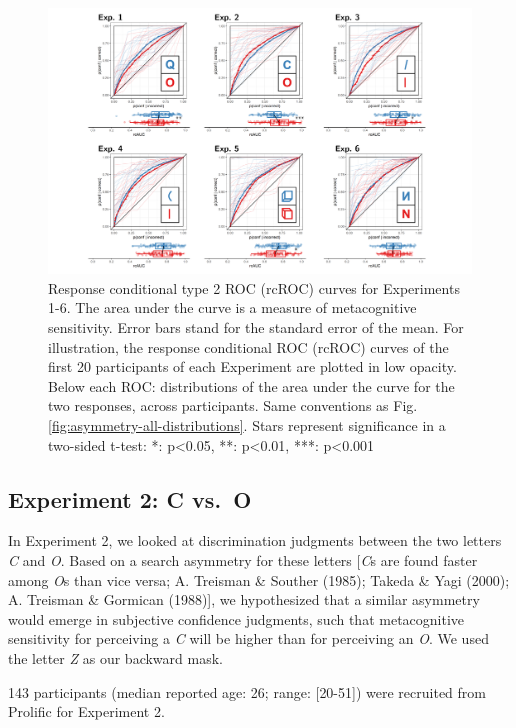 \documentclass[12pt,twoside]{reedthesis}
\begin{document}
\begin{figure}
\includegraphics[width=1\linewidth]{figure/asymmetry/rcROCs} \caption[rcROC curves for Experiments 1-6]{Response conditional type 2 ROC (rcROC) curves for Experiments 1-6. The area under the curve is a measure of metacognitive sensitivity. Error bars stand for the standard error of the mean. For illustration, the response conditional ROC (rcROC) curves of the first 20 participants of each Experiment are plotted in low opacity. Below each ROC: distributions of the area under the curve for the two responses, across participants. Same conventions as Fig. \ref{fig:asymmetry-all-distributions}. Stars represent significance in a two-sided t-test: *: p\textless0.05, **: p\textless0.01, ***: p\textless0.001}\label{fig:asymmetry-all-rcROCs}
\end{figure}
\hypertarget{experiment-2-c-vs.-o}{%
\subsection{Experiment 2: C vs.~O}\label{experiment-2-c-vs.-o}}

In Experiment 2, we looked at discrimination judgments between the two letters \emph{C} and \emph{O}. Based on a search asymmetry for these letters {[}\emph{C}s are found faster among \emph{O}s than vice versa; A. Treisman \& Souther (1985); Takeda \& Yagi (2000); A. Treisman \& Gormican (1988){]}, we hypothesized that a similar asymmetry would emerge in subjective confidence judgments, such that metacognitive sensitivity for perceiving a \emph{C} will be higher than for perceiving an \emph{O}. We used the letter \emph{Z} as our backward mask.

143 participants (median reported age: 26; range: {[}20-51{]}) were recruited from Prolific for Experiment 2.
\end{document}
